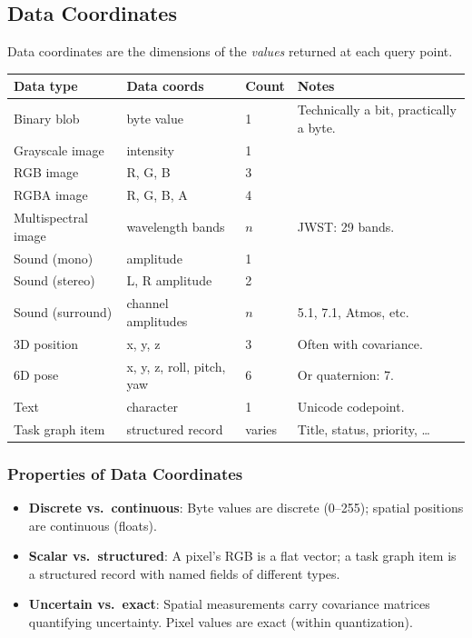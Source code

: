 \documentclass[11pt, letterpaper]{article}
\begin{document}
\subsection{Data Coordinates}

Data coordinates are the dimensions of the \emph{values} returned at each query point.

\begin{center}
\begin{tabularx}{\textwidth}{l l l X}
\toprule
\textbf{Data type} & \textbf{Data coords} & \textbf{Count} & \textbf{Notes} \\
\midrule
Binary blob & byte value & 1 & Technically a bit, practically a byte. \\
Grayscale image & intensity & 1 & \\
RGB image & R, G, B & 3 & \\
RGBA image & R, G, B, A & 4 & \\
Multispectral image & wavelength bands & $n$ & JWST: 29 bands. \\
Sound (mono) & amplitude & 1 & \\
Sound (stereo) & L, R amplitude & 2 & \\
Sound (surround) & channel amplitudes & $n$ & 5.1, 7.1, Atmos, etc. \\
3D position & x, y, z & 3 & Often with covariance. \\
6D pose & x, y, z, roll, pitch, yaw & 6 & Or quaternion: 7. \\
Text & character & 1 & Unicode codepoint. \\
Task graph item & structured record & varies & Title, status, priority, \ldots \\
\bottomrule
\end{tabularx}
\end{center}

\subsubsection{Properties of Data Coordinates}

\begin{itemize}[leftmargin=2em]
  \item \textbf{Discrete vs.\ continuous}: Byte values are discrete (0--255); spatial
    positions are continuous (floats).
  \item \textbf{Scalar vs.\ structured}: A pixel's RGB is a flat vector; a task graph
    item is a structured record with named fields of different types.
  \item \textbf{Uncertain vs.\ exact}: Spatial measurements carry covariance matrices
    quantifying uncertainty. Pixel values are exact (within quantization).
\end{itemize}
\end{document}
